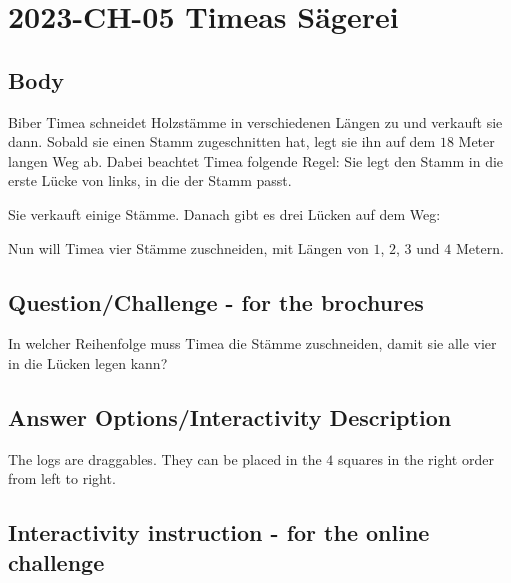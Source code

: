 \documentclass[a4paper,11pt]{report}
\newcommand{\taskGraphicsFolder}{..}
\begin{document}
\section*{\centering{} 2023-CH-05 Timeas Sägerei}


\subsection*{Body}

Biber Timea schneidet Holzstämme in verschiedenen Längen zu und verkauft sie dann.
Sobald sie einen Stamm zugeschnitten hat, legt sie ihn auf dem $18$ Meter langen Weg ab.
Dabei beachtet Timea folgende Regel: Sie legt den Stamm in die erste Lücke von links, in die der Stamm passt.

Sie verkauft einige Stämme. Danach gibt es drei Lücken auf dem Weg:

{\centering%
\par}

Nun will Timea vier Stämme zuschneiden, mit Längen von $1$, $2$, $3$ und $4$ Metern.

{\em


\subsection*{Question/Challenge - for the brochures}

In welcher Reihenfolge muss Timea die Stämme zuschneiden, damit sie alle vier in die Lücken legen kann?

{\centering%
\par}

}

\begingroup
\renewcommand{\arraystretch}{1.5}
\subsection*{Answer Options/Interactivity Description}

The logs are draggables. They can be placed in the $4$ squares in the right order from left to right.

\endgroup

\subsection*{Interactivity instruction - for the online challenge}
\end{document}
